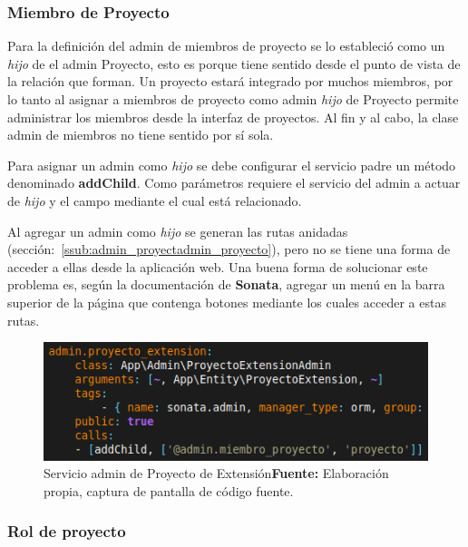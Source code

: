 \subsubsection{Miembro de Proyecto}%
\label{ssub:miembro_de_proyecto_admin}
Para la definición del admin de miembros de proyecto se lo estableció como un \textit{hijo} de el admin Proyecto, esto es porque tiene sentido desde el punto de vista
de la relación que forman. Un proyecto estará integrado por muchos miembros, por lo tanto al asignar a miembros de proyecto como admin \textit{hijo} de Proyecto permite
administrar los miembros desde la interfaz de proyectos. Al fin y al cabo, la clase admin de miembros no tiene sentido por sí sola.

Para asignar un admin como \textit{hijo} se debe configurar el servicio padre un método denominado \textbf{addChild}. Como parámetros requiere el servicio del admin
a actuar de \textit{hijo} y el campo mediante el cual está relacionado.


Al agregar un admin como \textit{hijo} se generan las rutas anidadas (sección:~\ref{ssub:admin_proyectadmin_proyecto}), pero no se tiene una forma de acceder a
ellas desde la aplicación web\@. Una buena forma de solucionar este problema es, según la documentación de \textbf{Sonata}, agregar un menú en la barra superior
de la página que contenga botones mediante los cuales acceder a estas rutas.\textcite{sonata-childAdmin}

\begin{figure}[h]
    \includegraphics[width=1\linewidth]{image/addChild.png}
    \caption{Servicio admin de Proyecto de Extensión\newline \textbf{Fuente:} Elaboración propia, captura de pantalla de código fuente.}
    \label{fig:image/addChild}
\end{figure}

\newpage
\subsubsection{Rol de proyecto}%
\label{ssub:rol_de_proyecto_admin}

